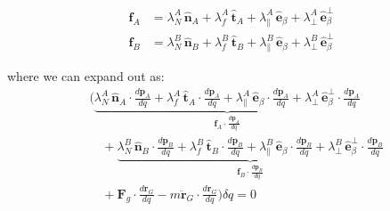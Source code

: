 \documentclass[11pt]{article}
\begin{document}
\[
\begin{aligned}
\mathbf{f}_A &= 
\lambda_N^A \, \hat{\mathbf{n}}_A +
\lambda_f^A \, \hat{\mathbf{t}}_A +
\lambda_{\parallel}^A \, \hat{\mathbf{e}}_\beta +
\lambda_{\perp}^A \, \hat{\mathbf{e}}_\beta^\perp \\[0.5em]
\mathbf{f}_B &= 
\lambda_N^B \, \hat{\mathbf{n}}_B +
\lambda_f^B \, \hat{\mathbf{t}}_B +
\lambda_{\parallel}^B \, \hat{\mathbf{e}}_\beta +
\lambda_{\perp}^B \, \hat{\mathbf{e}}_\beta^\perp
\end{aligned}
\]

where we can expand out as:
\[
\begin{aligned}
&\Big(
\underbrace{
\lambda_N^A \, \hat{\mathbf{n}}_A \cdot \frac{d\mathbf{p}_A}{dq}
+ \lambda_f^A \, \hat{\mathbf{t}}_A \cdot \frac{d\mathbf{p}_A}{dq}
+ \lambda_{\parallel}^A \, \hat{\mathbf{e}}_\beta \cdot \frac{d\mathbf{p}_A}{dq}
+ \lambda_{\perp}^A \, \hat{\mathbf{e}}_\beta^\perp \cdot \frac{d\mathbf{p}_A}{dq}
}_{\mathbf{f}_A \cdot \frac{d\mathbf{p}_A}{dq}} \\[0.8em]
&\quad
+ \underbrace{
\lambda_N^B \, \hat{\mathbf{n}}_B \cdot \frac{d\mathbf{p}_B}{dq}
+ \lambda_f^B \, \hat{\mathbf{t}}_B \cdot \frac{d\mathbf{p}_B}{dq}
+ \lambda_{\parallel}^B \, \hat{\mathbf{e}}_\beta \cdot \frac{d\mathbf{p}_B}{dq}
+ \lambda_{\perp}^B \, \hat{\mathbf{e}}_\beta^\perp \cdot \frac{d\mathbf{p}_B}{dq}
}_{\mathbf{f}_B \cdot \frac{d\mathbf{p}_B}{dq}} \\[0.8em]
&\quad
+ \mathbf{F}_g \cdot \frac{d\mathbf{r}_G}{dq}
- m \ddot{\mathbf{r}}_G \cdot \frac{d\mathbf{r}_G}{dq}
\Big) \delta q = 0
\end{aligned}
\]
\end{document}
